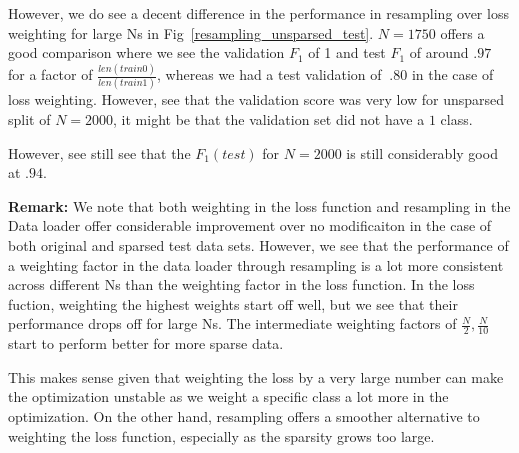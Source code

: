 \begin{solve}
\begin{enumerate}
    However, we do see a decent difference in the performance in resampling over loss weighting for large Ns in Fig~\ref{resampling_unsparsed_test}. $N=1750$ offers a good comparison where we see the validation $F_1$ of 1 and test $F_1$ of around $.97$ for a factor of $\frac{len(train 0)}{len(train 1)}$, whereas we had a test validation of $~.80$ in the case of loss weighting. However, see that the validation score was very low for unsparsed split of $N=2000$, it might be that the validation set did not have a $1$ class. 

    However, see still see that the $F_1 (test)$ for $N=2000$ is still considerably good at $.94$.


\textbf{Remark:}
We note that both weighting in the loss function and resampling in the Data loader offer considerable improvement over no modificaiton in the case of both original and sparsed test data sets. However, we see that the performance of a weighting factor in the data loader through resampling is a lot more consistent across different Ns than the weighting factor in the loss function. In the loss fuction, weighting the highest weights start off well, but we see that their performance drops off for large Ns. The intermediate weighting factors of $\frac{N}{2}, \frac{N}{10}$ start to perform better for more sparse data. 

This makes sense given that weighting the loss by a very large number can make the optimization unstable as we weight a specific class a lot more in the optimization. On the other hand, resampling offers a smoother alternative to weighting the loss function, especially as the sparsity grows too large.

\end{enumerate}


\end{solve}